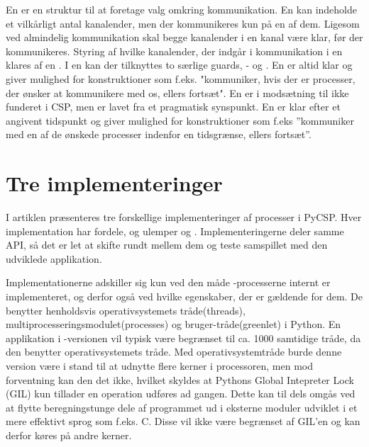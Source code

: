 En  er en struktur til at foretage valg omkring kommunikation. En  kan indeholde et vilkårligt antal kanalender, men der kommunikeres kun på en af dem. Ligesom ved almindelig kommunikation skal begge kanalender i en kanal være klar, før der kommunikeres. Styring af hvilke kanalender, der indgår i kommunikation i en   klares af en . I en  kan der tilknyttes to særlige guards, - og . En  er altid klar og giver mulighed for konstruktioner som f.eks. "kommuniker, hvis der er processer, der ønsker at kommunikere med os, ellers fortsæt". En  er i modsætning til  ikke funderet i CSP, men er lavet fra et pragmatisk synspunkt. En  er klar efter et angivent tidspunkt og giver mulighed for konstruktioner som f.eks ''kommuniker med en af de ønskede processer indenfor en tidsgrænse, ellers fortsæt''. 

\section{Tre implementeringer}
I artiklen \cite{Friborg2009} præsenteres tre forskellige implementeringer af processer i PyCSP. Hver implementation har fordele, og ulemper og . Implementeringerne deler samme API, så det er let at skifte rundt mellem dem og teste samspillet med den udviklede applikation. 

Implementationerne adskiller sig kun ved den måde \csp-processerne internt er implementeret, og derfor også ved hvilke egenskaber, der er gældende for dem. De benytter henholdsvis operativsystemets tråde(threads), multiprocesseringsmodulet(processes) og bruger-tråde(greenlet) i Python. En applikation i -versionen vil typisk være begrænset til ca. 1000 samtidige tråde, da den benytter operativsystemets tråde\cite[3]{Friborg2009}. Med operativsystemtråde burde denne version  være i stand til at udnytte flere kerner i processoren, men mod forventning kan den det ikke, hvilket skyldes at Pythons Global Intepreter Lock (GIL) kun tillader en operation udføres ad gangen. Dette kan til dels omgås ved at flytte beregningstunge dele af programmet ud i eksterne moduler udviklet i et mere effektivt sprog som f.eks. C. Disse vil ikke være begrænset af GIL'en og kan derfor køres på andre kerner. 

